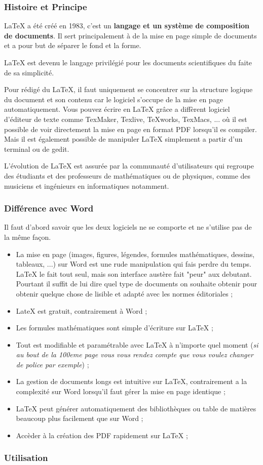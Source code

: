 \subsubsection{Histoire et Principe}

LaTeX a été créé en 1983, c'est un \textbf{langage et un système de composition de documents}.
Il sert principalement à de la mise en page simple de documents et a pour but de séparer le fond et la forme. 

LaTeX est devenu le langage privilégié pour les documents scientifiques du faite de sa simplicité. 

Pour rédigé du LaTeX, il faut uniquement se concentrer sur la structure logique du document et son contenu car le logiciel s'occupe de la mise en page automatiquement. 
Vous pouvez écrire en LaTeX grâce a diffèrent logiciel d’éditeur de texte comme TexMaker, Texlive, TeXworks, TexMacs, ... où il est possible de voir directement la mise en page en format PDF lorsqu'il es compiler.
Mais il est également possible de manipuler LaTeX simplement a partir d'un terminal ou de gedit.

L'évolution de LaTeX est assurée par la communauté d'utilisateurs qui regroupe des étudiants et des professeurs de mathématiques ou de physiques, comme des musiciens et ingénieurs en informatiques notamment.


\subsubsection{Différence avec Word}

Il faut d'abord savoir que les deux logiciels ne se comporte et ne s'utilise pas de la même façon. 

\begin{itemize}
\item La mise en page (images, figures, légendes, formules mathématiques, dessins, tableaux, ...) sur Word est une rude manipulation qui fais perdre du temps. LaTeX le fait tout seul, mais son interface austère fait "peur" aux debutant. Pourtant il suffit de lui dire quel type de documents on souhaite obtenir pour obtenir quelque chose de lisible et adapté avec les normes éditoriales ;
\item LateX est gratuit, contrairement à Word ;
\item Les formules mathématiques sont simple d'écriture sur LaTeX ;
\item Tout est modifiable et paramétrable avec LaTeX à n'importe quel moment (\textit{si au bout de la 100eme page vous vous rendez compte que vous voulez changer de police par exemple}) ;
\item La gestion de documents longs est intuitive sur LaTeX, contrairement a la complexité sur Word lorsqu'il faut gérer la mise en page identique ;
\item LaTeX peut générer automatiquement des bibliothèques ou table de matières beaucoup plus facilement que sur Word ;
\item Accèder à la création des PDF rapidement sur LaTeX ;
\end{itemize}


\subsubsection{Utilisation}

